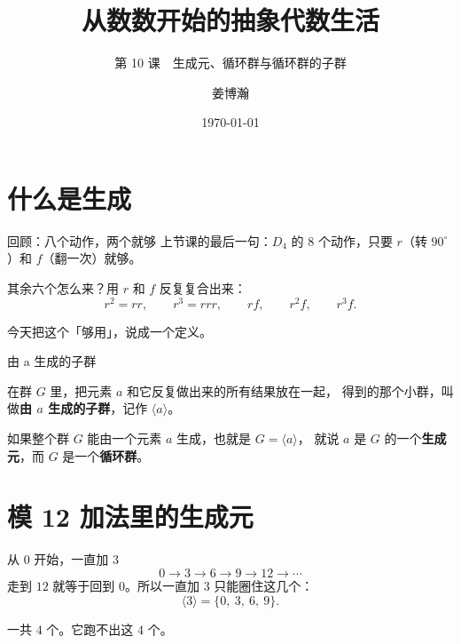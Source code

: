 \documentclass[10pt]{beamer}
\title{从数数开始的抽象代数生活}
\subtitle{第 10 课　生成元、循环群与循环群的子群}
\author{姜博瀚}
\institute{厦门大学附属实验中学}
\date{\today}
\begin{document}
\begin{frame}
  \titlepage
\end{frame}

\section{什么是生成}

\begin{frame}{回顾：八个动作，两个就够}
  上节课的最后一句：\(D_4\) 的 \(8\) 个动作，只要 \(r\)（转 \(90^\circ\)）和 \(f\)（翻一次）就够。
  \pause
  \begin{center}
    其余六个怎么来？\pause 用 \(r\) 和 \(f\) 反复复合出来：
    \[
      r^2=rr,\qquad r^3=rrr,\qquad rf,\qquad r^2f,\qquad r^3f .
    \]
  \end{center}
  \pause
  \begin{center}
    {\large 今天把这个「够用」，说成一个定义。}
  \end{center}
\end{frame}

\begin{frame}{由 a 生成的子群}
  \begin{definition}[由 \(a\) 生成的子群]
    在群 \(G\) 里，把元素 \(a\) 和它反复做出来的所有结果放在一起，
    得到的那个小群，叫做\textbf{由 \(a\) 生成的子群}，记作 \(\langle a\rangle\)。
  \end{definition}
  \pause
  \begin{definition}
    如果整个群 \(G\) 能由一个元素 \(a\) 生成，也就是 \(G=\langle a\rangle\)，
    就说 \(a\) 是 \(G\) 的一个\textbf{生成元}，而 \(G\) 是一个\textbf{循环群}。
  \end{definition}
\end{frame}

\section{模 12 加法里的生成元}

\begin{frame}{从 0 开始，一直加 3}
  \[
    0 \to 3 \to 6 \to 9 \to 12 \to \cdots
  \]
  \pause
  走到 \(12\) 就等于回到 \(0\)。所以一直加 \(3\) 只能圈住这几个：
  \[
    \langle 3\rangle=\{0,\ 3,\ 6,\ 9\} .
  \]
  \pause
  \begin{center}
    一共 \(4\) 个。\quad 它跑不出这 \(4\) 个。
  \end{center}
\end{frame}
\end{document}
